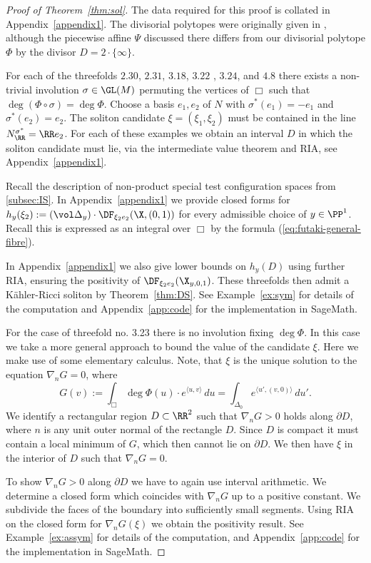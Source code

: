 \begin{proof}[Proof of Theorem~\ref{thm:sol}]
The data required for this proof is collated in Appendix~\ref{appendix1}. The divisorial polytopes were originally given in \cite{suss2013fano}, although the piecewise affine \(\Psi\) discussed there differs from our divisorial polytope \(\Phi\) by the divisor \(D = 2 \cdot \{ \infty \}\).

For each of the threefolds \(2.30\), \(2.31\), \(3.18\), \(3.22\) , \(3.24\), and \(4.8\) there exists a non-trivial involution \(\sigma \in \GL(M)\) permuting the vertices of \(\Box\) such that \(\deg (\Phi \circ \sigma) = \deg \Phi\). Choose a basis $e_1, e_2$ of $N$ with $\sigma^*(e_1)=-e_1$ and $\sigma^*(e_2)=e_2$. The soliton candidate $\xi = (\xi_1,\xi_2)$ must be contained in the line $N_\RR^{\sigma^*} = \RR e_2$. For each of these examples we obtain an interval \(D\) in which the soliton candidate must lie, via the intermediate value theorem and RIA, see Appendix~\ref{appendix1}.

Recall the description of non-product special test configuration spaces from \ref{subsec:IS}. In Appendix~\ref{appendix1} we provide closed forms for \(h_y(\xi_2) := (\vol \Delta_y) \cdot \DF_{\xi_2 e_2}(\X,(0,1))\) for every admissible choice of $y \in \PP^1$. Recall this is expressed as an integral over \(\Box\) by the formula (\ref{eq:futaki-general-fibre}).

In Appendix~\ref{appendix1} we also give lower bounds on \(h_y(D)\) using further RIA, ensuring the positivity of $\DF_{\xi_2 e_2}(\X_{y,0,1})$. These threefolds then admit a K\"ahler-Ricci soliton by Theorem~\ref{thm:DS}. See Example~\ref{ex:sym} for details of the computation and Appendix~\ref{app:code} for the implementation in SageMath.

For the case of threefold no. 3.23 there is no involution fixing $\deg \Phi$. In this case we take a more general approach to bound the value of the candidate \(\xi\). Here we make use of some elementary calculus. Note, that \(\xi\) is the unique solution to the equation \(\nabla_n G = 0 \), where 
\[
G(v) := \int_{\Box} \deg \Phi(u) \cdot e^{\langle u, v \rangle}\, du = 
\int_{\Delta_0} e^{\langle u', (v,0) \rangle} \, du'.
\]
We identify a rectangular region \(D \subset \RR^2 \) such that \(\nabla_n G > 0 \) holds along \(\partial D\), where \(n\) is any unit outer normal of the rectangle \(D\). Since $D$ is compact it must contain a local minimum of $G$, which then cannot lie on \(\partial D\). We then have \(\xi\) in the interior of \(D\) such that \(\nabla_n G = 0\).

To show $\nabla_n G >0 $ along $\partial D$ we have to again use interval arithmetic. We determine a closed form which coincides with $\nabla_n G$ up to a positive constant. We subdivide the faces of the boundary into sufficiently small segments. Using RIA on the closed form for $\nabla_n G(\xi)$ we obtain the positivity result. See Example~\ref{ex:assym} for details of the computation, and Appendix~\ref{app:code} for the implementation in SageMath.
\end{proof}
\newpage
